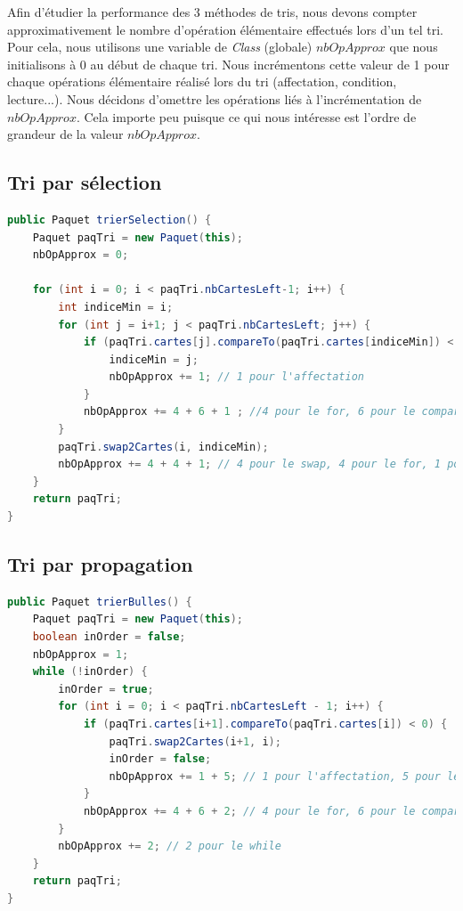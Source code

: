 \documentclass{report}
\begin{document}
\qquad Afin d'étudier la performance des 3 méthodes de tris, nous devons compter approximativement le nombre d'opération élémentaire effectués lors d'un tel tri. Pour cela, nous utilisons une variable de \textit{Class} (globale) $nbOpApprox$ que nous initialisons à 0 au début de chaque tri. Nous incrémentons cette valeur de 1 pour chaque opérations élémentaire réalisé lors du tri (affectation, condition, lecture...). Nous décidons d'omettre les opérations liés à l'incrémentation de $nbOpApprox$. Cela importe peu puisque ce qui nous intéresse est l'ordre de grandeur de la valeur $nbOpApprox$.

\subsection{Tri par sélection}

\begin{lstlisting}[language=java, caption={\it Fonction tri sélection}, label=codeSEL]
public Paquet trierSelection() {
    Paquet paqTri = new Paquet(this);
    nbOpApprox = 0;

    for (int i = 0; i < paqTri.nbCartesLeft-1; i++) {
        int indiceMin = i;
        for (int j = i+1; j < paqTri.nbCartesLeft; j++) {
            if (paqTri.cartes[j].compareTo(paqTri.cartes[indiceMin]) < 0) {
                indiceMin = j;
                nbOpApprox += 1; // 1 pour l'affectation
            }
            nbOpApprox += 4 + 6 + 1 ; //4 pour le for, 6 pour le compareTo, 1 pour le if
        }
        paqTri.swap2Cartes(i, indiceMin);
        nbOpApprox += 4 + 4 + 1; // 4 pour le swap, 4 pour le for, 1 pour l'affectation
    }
    return paqTri;
}
\end{lstlisting}

\subsection{Tri par propagation}

\begin{lstlisting}[language=java, caption={\it Fonction tri à bulles}, label=codeBUL]
public Paquet trierBulles() {
    Paquet paqTri = new Paquet(this);
    boolean inOrder = false;
    nbOpApprox = 1;
    while (!inOrder) {
        inOrder = true;
        for (int i = 0; i < paqTri.nbCartesLeft - 1; i++) {
            if (paqTri.cartes[i+1].compareTo(paqTri.cartes[i]) < 0) {
                paqTri.swap2Cartes(i+1, i);
                inOrder = false;
                nbOpApprox += 1 + 5; // 1 pour l'affectation, 5 pour le swap
            }
            nbOpApprox += 4 + 6 + 2; // 4 pour le for, 6 pour le compareTo, 2 pour le if
        }
        nbOpApprox += 2; // 2 pour le while
    }
    return paqTri;
}
\end{lstlisting}
\end{document}
